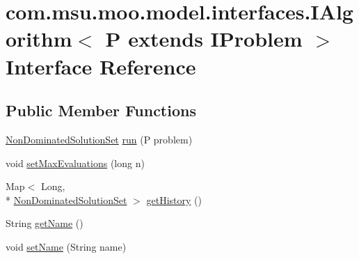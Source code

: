 \hypertarget{interfacecom_1_1msu_1_1moo_1_1model_1_1interfaces_1_1IAlgorithm_3_01P_01extends_01IProblem_01_4}{\section{com.\-msu.\-moo.\-model.\-interfaces.\-I\-Algorithm$<$ P extends I\-Problem $>$ Interface Reference}
\label{interfacecom_1_1msu_1_1moo_1_1model_1_1interfaces_1_1IAlgorithm_3_01P_01extends_01IProblem_01_4}
}
\subsection*{Public Member Functions}
\begin{DoxyCompactItemize}
\item 
\hyperlink{classcom_1_1msu_1_1moo_1_1model_1_1solution_1_1NonDominatedSolutionSet}{Non\-Dominated\-Solution\-Set} \hyperlink{interfacecom_1_1msu_1_1moo_1_1model_1_1interfaces_1_1IAlgorithm_3_01P_01extends_01IProblem_01_4_ad53bbbe3ea9a341b7bbf3a0104ca5315}{run} (P problem)
\item 
void \hyperlink{interfacecom_1_1msu_1_1moo_1_1model_1_1interfaces_1_1IAlgorithm_3_01P_01extends_01IProblem_01_4_a3114ec28cb5b0d2c4a8b5adef1932226}{set\-Max\-Evaluations} (long n)
\item 
Map$<$ Long, \\*
\hyperlink{classcom_1_1msu_1_1moo_1_1model_1_1solution_1_1NonDominatedSolutionSet}{Non\-Dominated\-Solution\-Set} $>$ \hyperlink{interfacecom_1_1msu_1_1moo_1_1model_1_1interfaces_1_1IAlgorithm_3_01P_01extends_01IProblem_01_4_a7b74b82fd1813895e5e741c9bb254c7b}{get\-History} ()
\item 
String \hyperlink{interfacecom_1_1msu_1_1moo_1_1model_1_1interfaces_1_1IAlgorithm_3_01P_01extends_01IProblem_01_4_a9b2e6160ffd2274fa75018c18b6580d2}{get\-Name} ()
\item 
void \hyperlink{interfacecom_1_1msu_1_1moo_1_1model_1_1interfaces_1_1IAlgorithm_3_01P_01extends_01IProblem_01_4_ab6d0d14d4349dedcad8eb083b0ce5f75}{set\-Name} (String name)
\end{DoxyCompactItemize}


